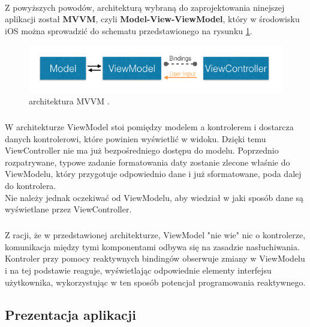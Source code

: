 \documentclass[12pt,oneside,a4paper]{report}
\begin{document}
\paragraph{}Z powyższych powodów, architekturą wybraną do zaprojektowania ninejszej aplikacji został \textbf{MVVM}, czyli \textbf{Model-View-ViewModel}, który w środowisku iOS można sprowadzić do schematu przedstawionego na rysunku \ref{rxMVVM}.
  	\begin{figure}[ht!]
  	\centering
  	\includegraphics[width=13cm]{rxMVVM}
  	\caption{architektura MVVM \cite{rxMVVM}.}
  	\label{rxMVVM}
  \end{figure}
\subparagraph{}W architekturze ViewModel stoi pomiędzy modelem a kontrolerem i dostarcza danych kontrolerowi, które powinien wyświetlić w widoku. Dzięki temu ViewController nie ma już bezpośredniego dostępu do modelu. Poprzednio rozpatrywane, typowe zadanie formatowania daty zostanie zlecone właśnie do ViewModelu, który przygotuje odpowiednio dane i już sformatowane, poda dalej do kontrolera.
\\Nie należy jednak oczekiwać od ViewModelu, aby wiedział w jaki sposób dane są wyświetlane przez ViewController. 
\subparagraph{}Z racji, że w przedstawionej architekturze, ViewModel "nie wie" nic o kontrolerze, komunikacja między tymi komponentami odbywa się na zasadzie nasłuchiwania. Kontroler przy pomocy reaktywnych bindingów obserwuje zmiany w ViewModelu i na tej podstawie reaguje, wyświetlając odpowiednie elementy interfejsu użytkownika, wykorzystując w ten sposób potencjał programowania reaktywnego. 
\pagebreak
\subsection{Prezentacja aplikacji}
\end{document}
